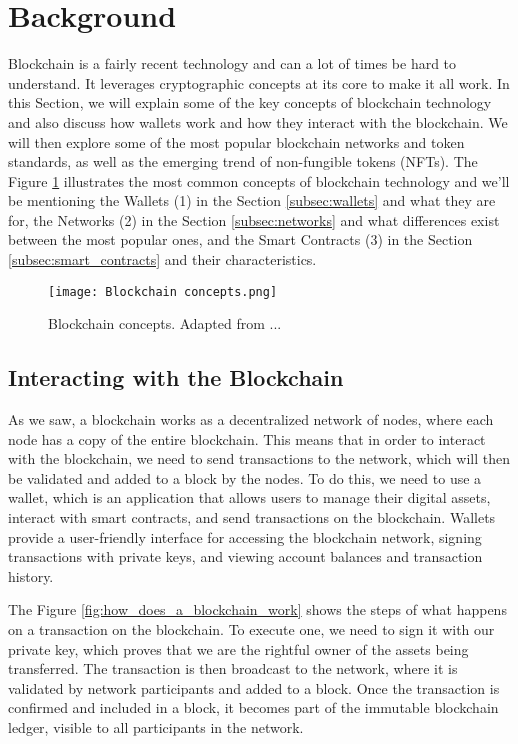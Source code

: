 \section{Background}
\label{sec:background}

Blockchain is a fairly recent technology and can a lot of times be hard to
understand. It leverages cryptographic concepts at its core to make it all
work. In this Section, we will explain some of the key concepts of blockchain
technology and also discuss how wallets work and how they interact with the
blockchain. We will then explore some of the most popular blockchain networks
and token standards, as well as the emerging trend of non-fungible tokens
(NFTs). The Figure \ref{fig:blockchain_concepts} illustrates the most common
concepts of blockchain technology and we'll be mentioning the Wallets (1) in
the Section \ref{subsec:wallets} and what they are for, the Networks (2) in the
Section \ref{subsec:networks} and what differences exist between the most
popular ones, and the Smart Contracts (3) in the Section
\ref{subsec:smart_contracts} and their characteristics.

\begin{figure}[H]
    \texttt{[image: Blockchain concepts.png]}
    \centering
    \caption[Blockchain concepts]{Blockchain concepts. Adapted from ...}
    \label{fig:blockchain_concepts}
\end{figure}

\subsection{Interacting with the Blockchain}
\label{subsec:interacting_with_the_blockchain}

As we saw, a blockchain works as a decentralized network of nodes, where each
node has a copy of the entire blockchain. This means that in order to interact
with the blockchain, we need to send transactions to the network, which will
then be validated and added to a block by the nodes. To do this, we need to use
a wallet, which is an application that allows users to manage their digital
assets, interact with smart contracts, and send transactions on the blockchain.
Wallets provide a user-friendly interface for accessing the blockchain network,
signing transactions with private keys, and viewing account balances and
transaction history.

The Figure \ref{fig:how_does_a_blockchain_work} shows the steps of what happens
on a transaction on the blockchain. To execute one, we need to sign it with our
private key, which proves that we are the rightful owner of the assets being
transferred. The transaction is then broadcast to the network, where it is
validated by network participants and added to a block. Once the transaction is
confirmed and included in a block, it becomes part of the immutable blockchain
ledger, visible to all participants in the network.

